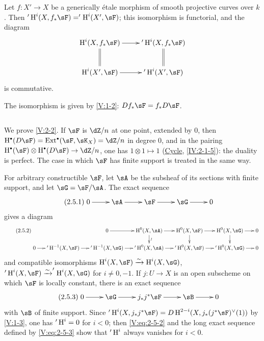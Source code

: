 \begin{corollary_}\label{V:2-4}
Let $f:X'\to X$ be a generically étale morphism of smooth projective curves
over $k$. Then $'\h^i(X,f_\ast \sF)='\h^i(X',\sF)$; this isomorphism is
functorial, and the diagram
\[\xymatrix{
  \h^i(X,f_\ast\sF) \ar[r] \ar@{=}[d]
    & '\h^i(X,f_\ast\sF) \ar@{=}[d] \\
  \h^i(X',\sF) \ar[r]
    & '\h^i(X',\sF)
}\]
is commutative.
\end{corollary_}

The isomorphism is given by \ref{V:1-2}: $D f_\ast\sF=f_\ast D\sF$.


\subsection{}\label{V:2-5}

We prove \ref{V:2-2}. If $\sF$ is $\dZ/n$ at one point, extended by $0$,
then $\h^\bullet(D\sF) = \ext^\bullet(\sF,\sK_X)=\dZ/n$ in degree $0$, and
in the pairing $\h^\bullet(\sF)\otimes\h^\bullet(D\sF) \to \dZ/n$, one has
$1\otimes 1\mapsto 1$ (\hyperref[IV]{Cycle}, \ref{IV:2-1-5}): the duality is
perfect. The case in which $\sF$ has finite support is treated in the same
way.

For arbitrary constructible $\sF$, let $\sA$ be the subsheaf of its sections
with finite support, and let $\sG=\sF/\sA$. The exact sequence
\begin{equation*}\label{V:eq:2-5-1}\tag{2.5.1}
\xymatrix{
  0 \ar[r]
    & \sA \ar[r]
    & \sF \ar[r]
    & \sG \ar[r]
    & 0
}
\end{equation*}
gives a diagram
\begin{equation*}\tag{2.5.2}\label{V:eq:2-5-2}
\xymatrix@=.5cm{
  & & 0 \ar[r]
    & \h^0(X,\sA) \ar[r] \ar[d]^-\wr
    & \h^0(X,\sF) \ar[r] \ar[d]
    & \h^0(X,\sG) \ar[r] \ar[d]
    & 0 \\
  0 \ar[r]
  & '\h^{-1}(X,\sF) \ar[r]
  & '\h^{-1}(X,\sG) \ar[r]
  & '\h^0(X,\sA) \ar[r]
  & '\h^0(X,\sF) \ar[r]
  & '\h^0(X,\sG) \ar[r]
  & 0
}
\end{equation*}
and compatible isomorphisms $\h^i(X,\sF)\iso \h^i(X,\sG)$,
$'\h^i(X,\sF) \iso '\h^i(X,\sG)$ for $i\ne 0,-1$. If $j:U\to X$ is an
open subscheme on which $\sF$ is locally constant, there is an exact sequence
\begin{equation*}\tag{2.5.3}\label{V:eq:2-5-3}
\xymatrix{
  0 \ar[r]
    & \sG \ar[r]
    & j_\ast j^\ast \sF \ar[r]
    & \sB \ar[r]
    & 0
}
\end{equation*}
with $\sB$ of finite support. Since
$'\h^i(X,j_\ast j^\ast\sF) = D \h^{2-i} (X,j_\ast(j^\ast\sF)^\vee(1))$
by \ref{V:1-3}, one has $'\operatorname{H}^i=0$ for $i<0$; then
\eqref{V:eq:2-5-2} and the long exact sequence defined by
\eqref{V:eq:2-5-3} show that $'\operatorname{H}^i$ always vanishes for $i<0$.

